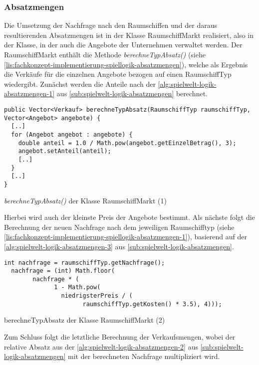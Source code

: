 \subsubsection{Absatzmengen}
\label{subsub:fachkonzept-implementierung-spiellogik-absatzmengen}

Die Umsetzung der Nachfrage nach den Raumschiffen und der daraus resultierenden Absatzmengen ist in der Klasse RaumschiffMarkt realisiert, also in der Klasse, in der auch die Angebote der Unternehmen verwaltet werden. Der RaumschiffMarkt enthält die Methode \textit{berechneTypAbsatz()} (siehe \ref{lis:fachkonzept-implementierung-spiellogik-absatzmengen}), welche als Ergebnis die Verkäufe für die einzelnen Angebote bezogen auf einen RaumschiffTyp wiedergibt. 
Zunächst werden die Anteile nach der \ref{alg:spielwelt-logik-absatzmengen-1} aus \ref{sub:spielwelt-logik-absatzmengen} berechnet.

\begin{programm}[htbp]
\begin{lstlisting}[breaklines=true]
public Vector<Verkauf> berechneTypAbsatz(RaumschiffTyp raumschiffTyp, Vector<Angebot> angebote) {
  [..]
  for (Angebot angebot : angebote) {
    double anteil = 1.0 / Math.pow(angebot.getEinzelBetrag(), 3);
	angebot.setAnteil(anteil);
	[..]
  }
  [..]
}
\end{lstlisting}
\caption{\textit{berechneTypAbsatz()} der Klasse RaumschiffMarkt (1)\label{lis:fachkonzept-implementierung-spiellogik-absatzmengen}}
\end{programm}

Hierbei wird auch der kleinste Preis der Angebote bestimmt. Als nächste folgt die Berechnung der neuen Nachfrage nach dem jeweiligen Raumschifftyp (siehe \ref{lis:fachkonzept-implementierung-spiellogik-absatzmengen-1}), basierend auf der \ref{alg:spielwelt-logik-absatzmengen-3} aus \ref{sub:spielwelt-logik-absatzmengen}.

\begin{programm}[htbp]
\begin{lstlisting}[breaklines=true]
  int nachfrage = raumschiffTyp.getNachfrage();
  nachfrage = (int) Math.floor(
  		nachfrage * (
          	  1 - Math.pow(
           	    niedrigsterPreis / (
              	      raumschiffTyp.getKosten() * 3.5), 4)));
\end{lstlisting}
\caption{berechneTypAbsatz der Klasse RaumschiffMarkt (2)\label{lis:fachkonzept-implementierung-spiellogik-absatzmengen-1}}
\end{programm}

Zum Schluss folgt die letztliche Berechnung der Verkaufsmengen, wobei der relative Absatz aus der \ref{alg:spielwelt-logik-absatzmengen-2} aus \ref{sub:spielwelt-logik-absatzmengen} mit der berechneten Nachfrage multipliziert wird. 




